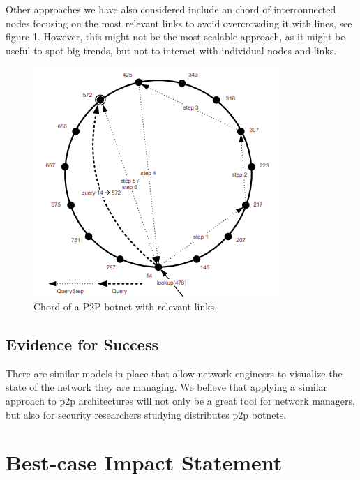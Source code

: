 \documentclass{proc}
\begin{document}
Other approaches we have also considered include an chord of interconnected nodes focusing on the most relevant links to avoid overcrowding it with lines, see figure 1. However, this might not be the most scalable approach, as it might be useful to spot big trends, but not to interact with individual nodes and links. 

\begin{figure}
  \includegraphics[width=\linewidth]{net_map.png}
  \caption{Chord of a P2P botnet with relevant links.}
  \label{fig1 :boat1}
\end{figure}

\subsection{Evidence for Success}

There are similar models in place that allow network engineers to visualize the state of the network they are managing. We believe that applying a similar approach to p2p architectures will not only be a great tool for network managers, but also for security researchers studying distributes p2p botnets. 

\section{Best-case Impact Statement}
\end{document}
